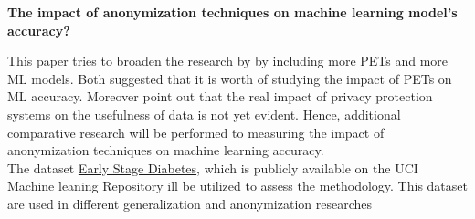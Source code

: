 \begin{center}
    \textbf{The impact of anonymization techniques on machine learning model's accuracy?}
\end{center}
This paper tries to broaden the research by \cite{oprescu2022energy, hoyos2020contribution} by including more PETs and more ML models. Both suggested that it is worth of studying the impact of PETs on ML accuracy. Moreover \cite{rodriguez2020contribution} point out that the real impact of privacy protection systems on the usefulness of data is not yet evident. Hence, additional comparative research will be performed to measuring the impact of anonymization techniques on machine learning accuracy.\\  
The  dataset  \href{https://archive.ics.uci.edu/ml/datasets/Early+stage+diabetes+risk+prediction+dataset.} {Early Stage Diabetes}, which is publicly available on the UCI Machine leaning Repository ill be utilized to assess the  methodology. This dataset are used in different generalization and anonymization researches \cite{oprescu2022energy,goldsteen2022anonymizing,Jaime}




